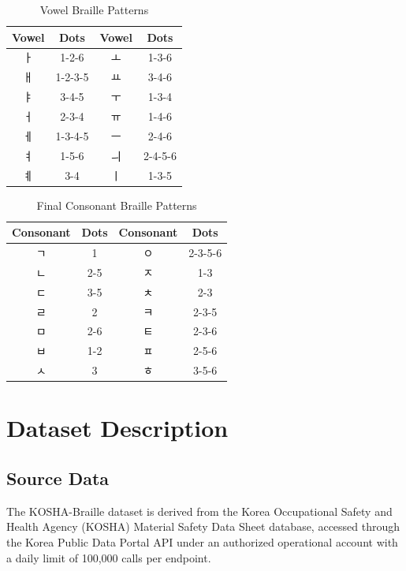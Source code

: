 \documentclass[smallextended]{svjour3}
\begin{document}
\begin{table}[H]
\centering
\caption{Vowel Braille Patterns}
\label{tab:jung}
\begin{tabular}{cccc}
\toprule
Vowel & Dots & Vowel & Dots \\
\midrule
{ㅏ} & 1-2-6 & {ㅗ} & 1-3-6 \\
{ㅐ} & 1-2-3-5 & {ㅛ} & 3-4-6 \\
{ㅑ} & 3-4-5 & {ㅜ} & 1-3-4 \\
{ㅓ} & 2-3-4 & {ㅠ} & 1-4-6 \\
{ㅔ} & 1-3-4-5 & {ㅡ} & 2-4-6 \\
{ㅕ} & 1-5-6 & {ㅢ} & 2-4-5-6 \\
{ㅖ} & 3-4 & {ㅣ} & 1-3-5 \\
\bottomrule
\end{tabular}
\end{table}

\begin{table}[H]
\centering
\caption{Final Consonant Braille Patterns}
\label{tab:jong}
\begin{tabular}{cccc}
\toprule
Consonant & Dots & Consonant & Dots \\
\midrule
{ㄱ} & 1 & {ㅇ} & 2-3-5-6 \\
{ㄴ} & 2-5 & {ㅈ} & 1-3 \\
{ㄷ} & 3-5 & {ㅊ} & 2-3 \\
{ㄹ} & 2 & {ㅋ} & 2-3-5 \\
{ㅁ} & 2-6 & {ㅌ} & 2-3-6 \\
{ㅂ} & 1-2 & {ㅍ} & 2-5-6 \\
{ㅅ} & 3 & {ㅎ} & 3-5-6 \\
\bottomrule
\end{tabular}
\end{table}

\section{Dataset Description}
\label{sec:dataset}

\subsection{Source Data}

The KOSHA-Braille dataset is derived from the Korea Occupational Safety and Health Agency (KOSHA) Material Safety Data Sheet database, accessed through the Korea Public Data Portal API \cite{data_go_kr} under an authorized operational account with a daily limit of 100,000 calls per endpoint.
\end{document}
